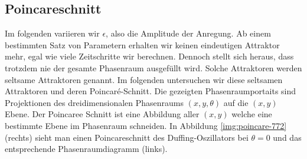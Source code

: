 \documentclass{scrartcl}
\begin{document}
\subsection{ Poincareschnitt }
Im folgenden variieren wir $\epsilon$, also die Amplitude der Anregung.
Ab einem bestimmten Satz von Parametern erhalten wir keinen eindeutigen Attraktor mehr, egal wie viele Zeitschritte wir berechnen. Dennoch stellt sich heraus, dass trotzdem nie der gesamte Phasenraum ausgefüllt wird. Solche Attraktoren werden seltsame Attraktoren genannt. Im folgenden untersuchen wir diese seltsamen Attraktoren und deren Poincaré-Schnitt. 
Die gezeigten Phasenraumportaits sind Projektionen des dreidimensionalen Phasenraums $(x,y,\theta)$ auf die $(x,y)$ Ebene. Der Poincaree Schnitt ist eine Abbildung aller $(x,y)$ welche eine bestimmte Ebene im Phasenraum schneiden. In Abbildung \ref{img:poincare-772} (rechts) sieht man einen Poincareschnitt des Duffing-Oszillators bei $\theta=0$ und das entsprechende Phasenraumdiagramm (links).
\end{document}
